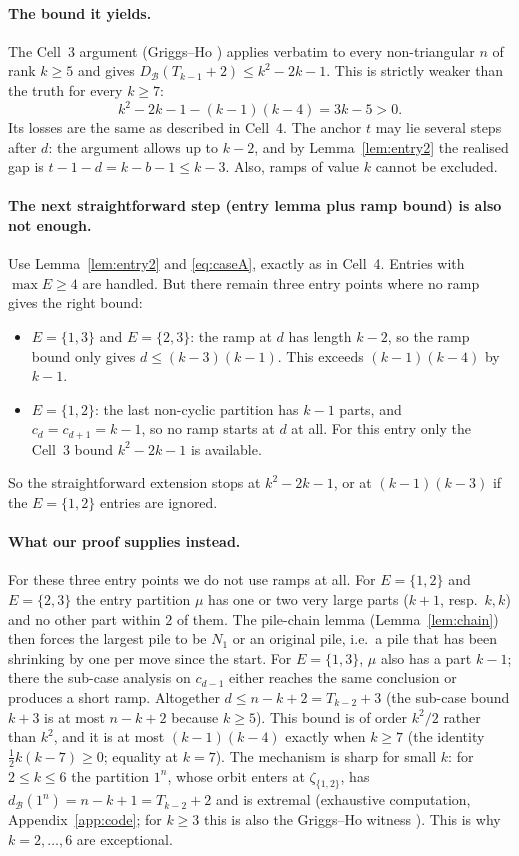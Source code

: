 \documentclass[11pt]{article}
\theoremstyle{definition}
\newcommand{\dB}{d_{\mathcal{B}}}
\newcommand{\DB}{D_{\mathcal{B}}}
\renewcommand{\le}{\leqslant}
\renewcommand{\ge}{\geqslant}
\begin{document}
\paragraph{The bound it yields.}  The Cell~3 argument (Griggs--Ho \cite[Thm.~4.4]{GH}) applies verbatim to every
non-triangular $n$ of rank $k\ge5$ and gives $\DB(T_{k-1}+2)\le k^2-2k-1$.  This is strictly weaker than the truth for
every $k\ge7$:
\[k^2-2k-1-(k-1)(k-4)=3k-5>0 .\]
Its losses are the same as described in Cell~4.  The anchor $t$ may lie several steps after $d$: the argument
allows up to $k-2$, and by Lemma~\ref{lem:entry2} the realised gap is $t-1-d=k-b-1\le k-3$.  Also, ramps of value $k$
cannot be excluded.

\paragraph{The next straightforward step (entry lemma plus ramp bound) is also not enough.}  Use
Lemma~\ref{lem:entry2} and \eqref{eq:caseA}, exactly as in Cell~4.  Entries with $\max E\ge4$ are handled.  But there
remain three entry points where no ramp gives the right bound:
\begin{itemize}
\item $E=\{1,3\}$ and $E=\{2,3\}$: the ramp at $d$ has length $k-2$, so the ramp bound only gives
$d\le(k-3)(k-1)$.  This exceeds $(k-1)(k-4)$ by $k-1$.
\item $E=\{1,2\}$: the last non-cyclic partition has $k-1$ parts, and $c_d=c_{d+1}=k-1$, so no ramp starts at $d$ at all.
For this entry only the Cell~3 bound $k^2-2k-1$ is available.
\end{itemize}
So the straightforward extension stops at $k^2-2k-1$, or at $(k-1)(k-3)$ if the $E=\{1,2\}$ entries are ignored.

\paragraph{What our proof supplies instead.}  For these three entry points we do not use ramps at all.  For
$E=\{1,2\}$ and $E=\{2,3\}$ the entry partition $\mu$ has one or two very large parts ($k+1$, resp.\ $k,k$) and no other
part within $2$ of them.  The pile-chain lemma (Lemma~\ref{lem:chain}) then forces the largest pile to be $N_1$ or an
original pile, i.e.\ a pile that has been shrinking by one per move since the start.  For $E=\{1,3\}$, $\mu$ also has
a part $k-1$; there the sub-case analysis on $c_{d-1}$ either reaches the same conclusion or produces a short ramp.
Altogether $d\le n-k+2=T_{k-2}+3$ (the sub-case bound $k+3$ is at most $n-k+2$ because $k\ge5$).  This bound is of order $k^2/2$ rather than $k^2$, and it is at most
$(k-1)(k-4)$ exactly when $k\ge7$ (the identity $\frac12k(k-7)\ge0$; equality at $k=7$).  The mechanism is sharp for small $k$: for $2\le k\le6$ the partition
$1^n$, whose orbit enters at $\zeta_{\{1,2\}}$, has $\dB(1^n)=n-k+1=T_{k-2}+2$ and is extremal (exhaustive computation,
Appendix~\ref{app:code}; for $k\ge3$ this is also the Griggs--Ho witness \cite[Thm.~4.5, case (2)]{GH}).  This is why
$k=2,\dots,6$ are exceptional.
\end{document}
